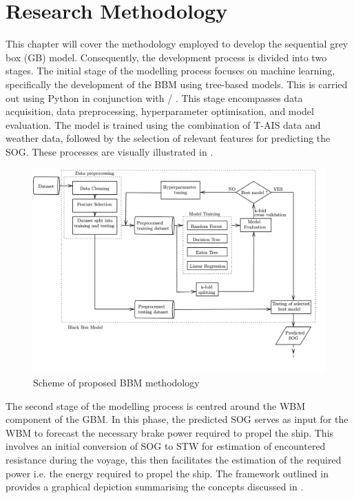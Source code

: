 \chapter{Research Methodology} \label{chp:method}

This chapter will cover the methodology employed to develop the sequential grey box (GB) model. Consequently, the development process is divided into two stages. The initial stage of the modelling process focuses on machine learning, specifically the development of the BBM using tree-based models. This is carried out using Python in conjunction with \scikit/ . This stage encompasses data acquisition, data preprocessing, hyperparameter optimisation, and model evaluation. The model is trained using the combination of T-AIS data and weather data, followed by the selection of relevant features for predicting the SOG. These processes are visually illustrated in .

\begin{figure}[h]
    \centering
        \includegraphics[width=\textwidth]{02_figures/flowmethod_BBM_alt.png}
        \caption{Scheme of proposed BBM methodology}
        \label{fig:flowchart_BBM}
\end{figure}

The second stage of the modelling process is centred around the WBM component of the GBM. In this phase, the predicted SOG serves as input for the WBM to forecast the necessary brake power required to propel the ship. This involves an initial conversion of SOG to STW for estimation of encountered resistance during the voyage, this then facilitates the estimation of the required power i.e. the energy required to propel the ship. The framework outlined in  provides a graphical depiction summarising the concepts discussed in .

